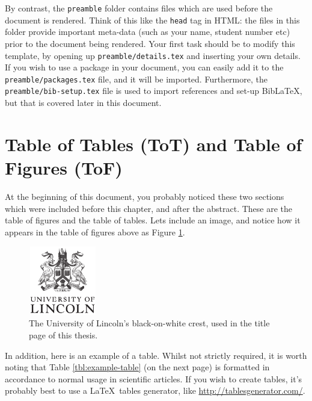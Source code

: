 By contrast, the \texttt{preamble} folder contains files which are used before the document is rendered. Think of this like the \texttt{head} tag in HTML: the files in this folder provide important meta-data (such as your name, student number etc) prior to the document being rendered. Your first task should be to modify this template, by opening up \texttt{preamble/details.tex} and inserting your own details. If you wish to use a package in your document, you can easily add it to the \texttt{preamble/packages.tex} file, and it will be imported.  Furthermore, the \texttt{preamble/bib-setup.tex} file is used to import references and set-up Bib\LaTeX, but that is covered later in this document.


\section{Table of Tables (ToT) and Table of Figures (ToF)}
At the beginning of this document, you probably noticed these two sections which were included before this chapter, and after the abstract. These are the table of figures and the table of tables. Lets include an image, and notice how it appears in the table of figures above as Figure \ref{fig:tof-example}.

\begin{figure}[htb]
    \centering
    \includegraphics[width=3cm, height=3cm]{logo.pdf}
    \caption{The University of Lincoln's black-on-white crest, used in the title page of this thesis.}
    \label{fig:tof-example}
\end{figure}

In addition, here is an example of a table. Whilst not strictly required, it is worth noting that Table \ref{tbl:example-table} (on the next page) is formatted in accordance to normal usage in scientific articles. If you wish to create tables, it's probably best to use a \LaTeX~tables generator, like \url{http://tablesgenerator.com/}.

